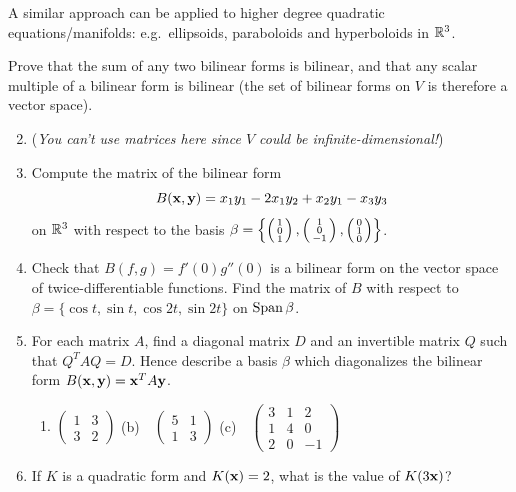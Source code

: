 A similar approach can be applied to higher degree quadratic equations/manifolds: e.g.\ ellipsoids, paraboloids and hyperboloids in $\mathbb{R}^3$.

\vfil
 
\begin{exercises}
	\exstart Prove that the sum of any two bilinear forms is bilinear, and that any scalar multiple of a bilinear form is bilinear (the set of bilinear forms on $V$ is therefore a vector space).\vspace{-8pt}
	\begin{enumerate}\setcounter{enumi}{1}
	  \item[](\emph{You can't use matrices here since $V$ could be infinite-dimensional!}) 
	  
	  \item Compute the matrix of the bilinear form
	  \[
	  	B({\mathbf{x}},{\mathbf{y}})=x_1y_1-2x_1y_2+x_2y_1-x_3y_3
	  \]
	  on $\mathbb{R}^3$ with respect to the basis $\beta=\left\{\left(\begin{smallmatrix}1\\0\\1\end{smallmatrix}\right),\left(\begin{smallmatrix}1\\0\\-1\end{smallmatrix}\right),\left(\begin{smallmatrix}0\\1\\0\end{smallmatrix}\right)\right\}$.
	  
	  
	  \item Check that $B(f,g)=f'(0)g''(0)$ is a bilinear form on the vector space of twice-differentiable functions. Find the matrix of $B$ with respect to $\beta=\{\cos t,\sin t,\cos 2t,\sin 2t\}$ on $\operatorname{Span}\beta$.
	  
	  
	  \item For each matrix $A$, find a diagonal matrix $D$ and an invertible matrix $Q$ such that $Q^TAQ=D$. Hence describe a basis $\beta$ which diagonalizes the bilinear form $B({\mathbf{x}},{\mathbf{y}})={\mathbf{x}}^TA{\mathbf{y}}$.
	  \begin{enumerate}
	    \item $\begin{pmatrix}
	    	1&3\\
	    	3&2
	    \end{pmatrix}$
	    \qquad
	    (b)\ \ $\begin{pmatrix}
	    	5&1\\
	    	1&3
	    \end{pmatrix}$
	    \qquad
	    (c)\ \ $\begin{pmatrix}
	    	3&1&2\\
	    	1&4&0\\
	    	2&0&-1
	    \end{pmatrix}$
	  \end{enumerate}
	  
	  
	  \item If $K$ is a quadratic form and $K({\mathbf{x}})=2$, what is the value of $K(3{\mathbf{x}})$?
	  

\end{enumerate}
\end{exercises}
